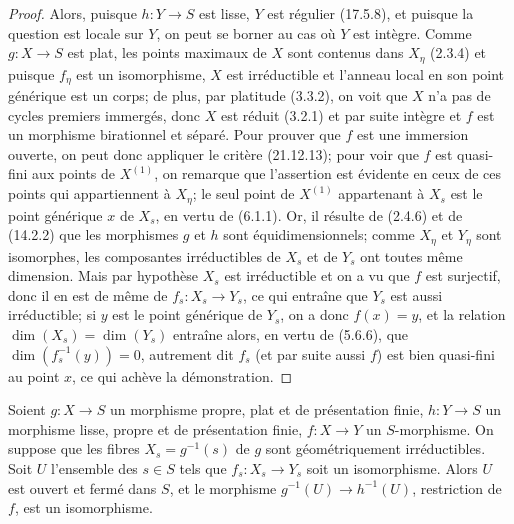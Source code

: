 \begin{proof}
Alors, puisque $h:Y\to S$ est lisse, $Y$ est régulier (17.5.8), et puisque la question
est locale sur $Y$, on peut se borner au cas où $Y$ est intègre. Comme $g:X\to S$ est
plat, les points maximaux de $X$ sont contenus dans $X_\eta$ (2.3.4) et puisque
$f_\eta$ est un isomorphisme, $X$ est irréductible et l'anneau local en son point
générique est un corps; de plus, par platitude (3.3.2), on voit que $X$ n'a pas de cycles
premiers immergés, donc $X$ est réduit (3.2.1) et par suite intègre et $f$ est un
morphisme birationnel et séparé. Pour prouver que $f$ est une immersion ouverte, on peut
donc appliquer le critère (21.12.13); pour voir que $f$ est quasi-fini aux points de
$X^{(1)}$, on remarque que l'assertion est évidente en ceux de ces points qui
appartiennent à $X_\eta$; le seul point de $X^{(1)}$ appartenant à $X_s$ est le point
générique $x$ de $X_s$, en vertu de (6.1.1). Or, il résulte de (2.4.6) et de (14.2.2)
que les morphismes $g$ et $h$ sont équidimensionnels; comme $X_\eta$ et $Y_\eta$ sont
isomorphes, les composantes irréductibles de $X_s$ et de $Y_s$ ont toutes même
dimension. Mais par hypothèse $X_s$ est irréductible et on a vu que $f$ est surjectif,
donc il en est de même de $f_s:X_s\to Y_s$, ce qui entraîne que $Y_s$ est aussi
irréductible; si $y$ est le point générique de $Y_s$, on a donc $f(x)=y$, et la relation
$\dim(X_s)=\dim(Y_s)$ entraîne alors, en vertu de (5.6.6), que
$\dim(f_s^{-1}(y))=0$, autrement dit $f_s$ (et par suite aussi $f$) est bien quasi-fini
au point $x$, ce qui achève la démonstration.
\end{proof}

\begin{corollary}[21.12.16]
\label{IV.21.12.16}
Soient $g:X\to S$ un morphisme propre, plat et de présentation finie, $h:Y\to S$ un
morphisme lisse, propre et de présentation finie, $f:X\to Y$ un $S$-morphisme. On
suppose que les fibres $X_s=g^{-1}(s)$ de $g$ sont géométriquement irréductibles. Soit
$U$ l'ensemble des $s\in S$ tels que $f_s:X_s\to Y_s$ soit un isomorphisme. Alors
$U$ est ouvert et fermé dans $S$, et le morphisme $g^{-1}(U)\to h^{-1}(U)$,
restriction de $f$, est un isomorphisme.
\end{corollary}

